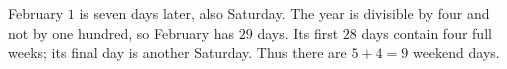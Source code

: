 February $1$ is seven days later, also Saturday. The year is divisible by four and not by one hundred, so February has $29$ days. Its first $28$ days contain four full weeks; its final day is another Saturday. Thus there are $5+4=\boxed9$ weekend days.
